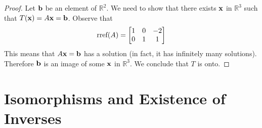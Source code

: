 \documentclass{ximera}
\renewcommand{\vec}[1]{{\bf #1}}
\newcommand{\RR}{\mathbb{R}}
\begin{document}
\begin{example}
\begin{proof}

Let $\vec{b}$ be an element of $\RR^2$.  We need to show that there exists $\vec{x}$ in $\RR^3$ such that $T(\vec{x})=A\vec{x}=\vec{b}$. 
Observe that
 $$\textnormal{rref}(A)=\begin{bmatrix}1 & 0 & -2\\0 & 1 & 1\end{bmatrix}$$
 This means that $A\vec{x}=\vec{b}$ has a solution (in fact, it has infinitely many solutions).  Therefore $\vec{b}$ is an image of some $\vec{x}$ in $\RR^3$. We conclude that $T$ is onto. 
 
 


\end{proof}
\end{example}

\section*{Isomorphisms and Existence of Inverses}
\end{document}
